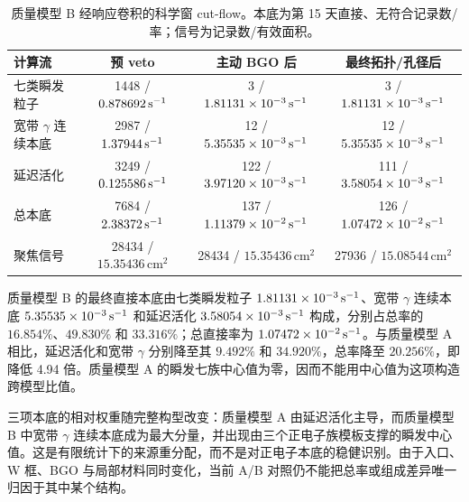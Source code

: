 \begin{table}[H]
\centering
\caption{质量模型 B 经响应卷积的科学窗 cut-flow。本底为第 15 天直接、无符合记录数/率；信号为记录数/有效面积。}
\label{tab:optimized_cutflow_zh}
\footnotesize
\begin{tabular}{lccc}
\toprule
计算流 & 预 veto & 主动 BGO 后 & 最终拓扑/孔径后 \\
\midrule
七类瞬发粒子 & 1448 / $0.878692\,\mathrm{s^{-1}}$ & 3 / $1.81131\times10^{-3}\,\mathrm{s^{-1}}$ & 3 / $1.81131\times10^{-3}\,\mathrm{s^{-1}}$ \\
宽带 $\gamma$ 连续本底 & 2987 / $1.37944\,\mathrm{s^{-1}}$ & 12 / $5.35535\times10^{-3}\,\mathrm{s^{-1}}$ & 12 / $5.35535\times10^{-3}\,\mathrm{s^{-1}}$ \\
延迟活化 & 3249 / $0.125586\,\mathrm{s^{-1}}$ & 122 / $3.97120\times10^{-3}\,\mathrm{s^{-1}}$ & 111 / $3.58054\times10^{-3}\,\mathrm{s^{-1}}$ \\
总本底 & 7684 / $2.38372\,\mathrm{s^{-1}}$ & 137 / $1.11379\times10^{-2}\,\mathrm{s^{-1}}$ & 126 / $1.07472\times10^{-2}\,\mathrm{s^{-1}}$ \\
聚焦信号 & 28434 / $15.35436\,\mathrm{cm^2}$ & 28434 / $15.35436\,\mathrm{cm^2}$ & 27936 / $15.08544\,\mathrm{cm^2}$ \\
\bottomrule
\end{tabular}
\end{table}

质量模型 B 的最终直接本底由七类瞬发粒子 $1.81131\times10^{-3}\,\mathrm{s^{-1}}$、宽带 $\gamma$ 连续本底 $5.35535\times10^{-3}\,\mathrm{s^{-1}}$ 和延迟活化 $3.58054\times10^{-3}\,\mathrm{s^{-1}}$ 构成，分别占总率的 $16.854\%$、$49.830\%$ 和 $33.316\%$；总直接率为 $1.07472\times10^{-2}\,\mathrm{s^{-1}}$。与质量模型 A 相比，延迟活化和宽带 $\gamma$ 分别降至其 $9.492\%$ 和 $34.920\%$，总率降至 $20.256\%$，即降低 4.94 倍。质量模型 A 的瞬发七族中心值为零，因而不能用中心值为这项构造跨模型比值。

三项本底的相对权重随完整构型改变：质量模型 A 由延迟活化主导，而质量模型 B 中宽带 $\gamma$ 连续本底成为最大分量，并出现由三个正电子族模板支撑的瞬发中心值。这是有限统计下的来源重分配，而不是对正电子本底的稳健识别。由于入口、W 框、BGO 与局部材料同时变化，当前 A/B 对照仍不能把总率或组成差异唯一归因于其中某个结构。

\begin{table}[!ht]
\centering
\caption{质量模型 B 第 15 天最终直接本底的有限输运支撑。标准误差和有效样本量由不等权事例的 $\sum_i w_i^2$ 计算。}
\label{tab:optimized_component_precision_zh}
\scriptsize
{}
\end{table}

